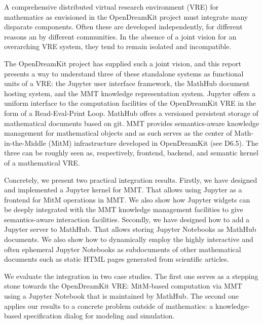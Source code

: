 A comprehensive distributed virtual research environment (VRE) for mathematics as envisioned in the OpenDreamKit project must integrate many disparate components.
Often these are developed independently, for different reasons an by different communities.
In the absence of a joint vision for an overarching VRE system, they tend to remain isolated and incompatible.

The OpenDreamKit project has supplied such a joint vision, and this report presents a way to understand three of these standalone systems as functional units of a VRE: the Jupyter user interface framework, the MathHub document hosting system, and the MMT knowledge representation system.
Jupyter offers a uniform interface to the computation facilities of the OpenDreamKit VRE in the form of a Read-Eval-Print Loop.
MathHub offers a versioned persistent storage of mathematical documents based on git.
MMT provides semantics-aware knowledge management for mathematical objects and as such serves as the center of Math-in-the-Middle (MitM) infrastructure developed in OpenDreamKit (see D6.5).
The three can be roughly seen as, respectively, frontend, backend, and semantic kernel of a mathematical VRE.

Concretely, we present two practical integration results.
Firstly, we have designed and implemented a Jupyter kernel for MMT.
That allows using Jupyter as a frontend for MitM operations in MMT.
We also show how Jupyter widgets can be deeply integrated with the MMT knowledge management facilities to give semantics-aware interaction facilities.
Secondly, we have designed how to add a Jupyter server to MathHub.
That allows storing Jupyter Notebooks as MathHub documents.
We also show how to dynamically employ the highly interactive and often ephemeral Jupyter Notebooks as subdocuments of other mathematical documents such as static HTML pages generated from scientific articles.

We evaluate the integration in two case studies.
The first one serves as a stepping stone towards the OpenDreamKit VRE: MitM-based computation via MMT using a Jupyter Notebook that is maintained by MathHub.
The second one applies our results to a concrete problem outside of mathematics: a knowledge-based specification dialog for modeling and simulation.